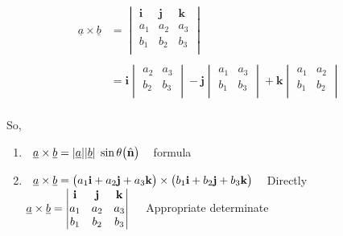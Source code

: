 \documentclass[11pt,a4paper]{article}
\begin{document}
\begin{align*}
\underline{a}\times \underline{b} & = \begin{vmatrix}
\textbf{i} & \textbf{j} & \textbf{k}\\
a_1 & a_2 & a_3\\
b_1 & b_2 & b_3\\
\end{vmatrix}\\\\
& = \textbf{i}\begin{vmatrix}
a_2 & a_3\\
b_2 & b_3\\
\end{vmatrix} - \textbf{j}\begin{vmatrix}
a_1 & a_3\\
b_1 & b_3\\
\end{vmatrix} + \textbf{k}\begin{vmatrix}
a_1 & a_2\\
b_1 & b_2\\
\end{vmatrix}\\
\end{align*}




So,
\begin{enumerate}
\item $\hspace{0.2cm}\underline{a} \times \underline{b} = |\underline{a}||\underline{b}|\hspace{0.1cm}\sin \theta \big(\hat{\textbf{n}}\big)\hspace{0.3cm}$ formula\\

\item $\hspace{0.2cm}\underline{a} \times \underline{b} = \big( a_1 \textbf{i} + a_2\textbf{j} + a_3\textbf{k}\big)\times \big(b_1 \textbf{i} + b_2\textbf{j} + b_3\textbf{k}\big)\hspace{0.3cm}$ Directly\\



$\underline{a}\times \underline{b}  = \begin{vmatrix}
\textbf{i} & \textbf{j} & \textbf{k}\\
a_1 & a_2 & a_3\\
b_1 & b_2 & b_3\\
\end{vmatrix}\hspace{0.4cm} $ Appropriate determinate\\\\\
\end{enumerate}
\end{document}
